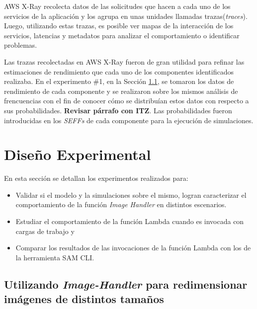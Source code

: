 AWS X-Ray recolecta datos de las solicitudes que hacen a cada uno de los servicios de la aplicación y los agrupa en unas unidades llamadas trazas(\emph{traces}). Luego, utilizando estas trazas, es posible ver mapas de la interacción de los servicios, latencias y metadatos para analizar el comportamiento o identificar problemas.


Las trazas recolectadas en AWS X-Ray fueron de gran utilidad para refinar las estimaciones de rendimiento que cada uno de los componentes identificados realizaba. En el experimento \#1, en la Sección \ref{sec:experimento-1}, se tomaron los datos de rendimiento de cada componente y se realizaron sobre los mismos análisis de frencuencias con el fin de conocer cómo se distribuían estos datos con respecto a sus probabilidades. \textbf{Revisar párrafo con ITZ}. Las probabilidades fueron introducidas en los \emph{SEFFs} de cada componente para la ejecución de simulaciones.   


\section{Diseño Experimental}
En esta sección se detallan los experimentos realizados para:
\begin{itemize}
    \item Validar si el modelo y la simulaciones sobre el mismo, logran caracterizar el comportamiento de la función \emph{Image Handler} en distintos escenarios. 
    \item Estudiar el comportamiento de la función Lambda cuando es invocada con cargas de trabajo y
    \item Comparar los resultados de las invocaciones de la función Lambda con los de la herramienta SAM CLI.
\end{itemize}

\subsection{Utilizando \emph{Image-Handler} para redimensionar imágenes de distintos tamaños} \label{sec:experimento-1}

